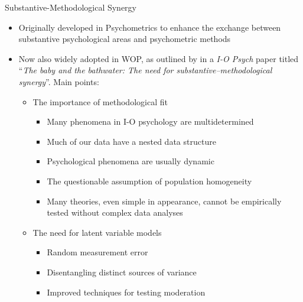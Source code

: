 \documentclass{beamer}
\begin{document}
\begin{frame}{Substantive-Methodological Synergy}
	\begin{itemize}
	    \item<1> Originally developed in Psychometrics \parencite[e.g.,][]{borsboom2006} to enhance the exchange between substantive psychological areas and psychometric methods
	    \item<2-> Now also widely adopted in WOP, as outlined by \textcite[]{hofmans2021} in a \textit{I-O Psych} paper titled   ``\textit{The baby and the bathwater: The need for substantive–methodological synergy}''. Main points: 
	    \begin{itemize}
	        \item<3> The importance of methodological fit
	        \begin{itemize}
	            \item Many phenomena in I-O psychology are multidetermined
	            \item Much of our data have a nested data structure
	            \item Psychological phenomena are usually dynamic
	            \item The questionable assumption of population homogeneity
	            \item Many theories, even simple in appearance, cannot be empirically tested without complex data analyses
	        \end{itemize}
	        \item<4> The need for latent variable models
	        \begin{itemize}
	            \item Random measurement error
	            \item Disentangling distinct sources of variance
	            \item Improved techniques for testing moderation
	        \end{itemize}
	        \end{itemize}
	    \end{itemize}
\end{frame}
\end{document}
